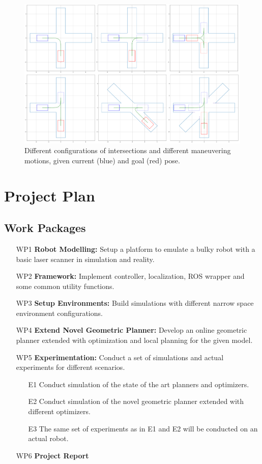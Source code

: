 \documentclass[rnd]{mas_proposal}
\begin{document}
\begin{figure}[!ht]
\centering
\includegraphics[scale=0.33]{images/inter.png}
\caption{Different configurations of intersections and different maneuvering motions, given current (blue) and goal (red) pose.}
\label{Fig:inter}
\end{figure}

\section{Project Plan}
\subsection{Work Packages}
\begin{enumerate}
    \item[WP1] {\bf Robot Modelling:} Setup a platform to emulate a bulky robot with a basic laser scanner in simulation and reality.
    \item[WP2] {\bf Framework:} Implement controller, localization, ROS wrapper and some common utility functions.
    \item[WP3] {\bf Setup Environments:} Build simulations with different narrow space environment configurations.   
    \item[WP4] {\bf Extend Novel Geometric Planner:} Develop an online geometric planner extended with optimization and local planning for the given model. 
    \item[WP5] {\bf Experimentation:} Conduct a set of simulations and actual experiments for different scenarios. 
    \begin{enumerate}
        \item[E1] Conduct simulation of the state of the art planners and optimizers.
        \item[E2] Conduct simulation of the novel geometric planner extended with different optimizers.
        \item[E3] The same set of experiments as in E1 and E2 will be conducted on an actual robot.
    \end{enumerate}
    \item[WP6] {\bf Project Report}
\end{enumerate}
\end{document}
